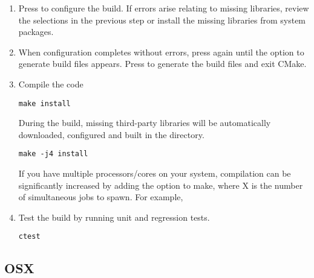 \begin{enumerate}
    \item Press  to configure the build. If errors arise relating to
    missing libraries, review the  selections in the previous
    step or install the missing libraries from system packages. 
    
    \item When configuration completes without errors, press  again
    until the option  to generate build files appears. Press 
    to generate the build files and exit CMake.
    
    \item Compile the code
    \begin{lstlisting}[style=BashInputStyle]
        make install
    \end{lstlisting}
    During the build, missing third-party libraries will be automatically
    downloaded, configured and built in the \nekpp {} directory.
    
    \newsavebox\installationLinuxTip
    \begin{lrbox}{\installationLinuxTip}\begin{minipage}{0.8\linewidth}
    \begin{lstlisting}[style=BashInputStyle]
    make -j4 install
    \end{lstlisting}
    \end{minipage}
    \end{lrbox}
    
    \begin{tipbox}
    If you have multiple processors/cores on your system, compilation can be
    significantly increased by adding the  option to make, where X is
    the number of simultaneous jobs to spawn. For example,
    \noindent\usebox\installationLinuxTip
    \end{tipbox}
    
    \item Test the build by running unit and regression tests.
    \begin{lstlisting}[style=BashInputStyle]
    ctest
    \end{lstlisting}
\end{enumerate}

\subsection{OSX}

